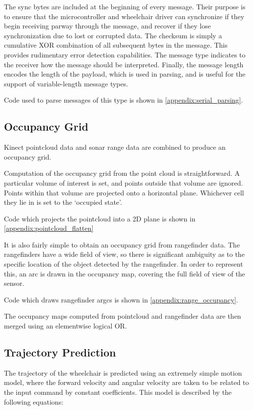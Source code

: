 \documentclass[oneside,final,a4paper]{report}
\begin{document}
The sync bytes are included at the beginning of every message.  Their purpose is to ensure that the microcontroller and wheelchair driver can synchronize if they begin receiving parway through the message, and recover if they lose synchronization due to lost or corrupted data.  The checksum is simply a cumulative XOR combination of all subsequent bytes in the message.  This provides rudimentary error detection capabilities.  The message type indicates to the receiver how the message should be interpreted.  Finally, the message length encodes the length of the payload, which is used in parsing, and is useful for the support of variable-length message types.

Code used to parse messages of this type is shown in \ref{appendix:serial_parsing}.

\subsection{Occupancy Grid}
Kinect pointcloud data and sonar range data are combined to produce an occupancy grid.  

Computation of the occupancy grid from the point cloud is straightforward.  A particular volume of interest is set, and points outside that volume are ignored.  Points within that volume are projected onto a horizontal plane.  Whichever cell they lie in is set to the `occupied state'.

Code which projects the pointcloud into a 2D plane is shown in \ref{appendix:pointcloud_flatten}

It is also fairly simple to obtain an occupancy grid from rangefinder data.  The rangefinders have a wide field of view, so there is significant ambiguity as to the specific location of the object detected by the rangefinder.  In order to represent this, an arc is drawn in the occupancy map, covering the full field of view of the sensor.

Code which draws rangefinder argcs is shown in \ref{appendix:range_occupancy}.

The occupancy maps computed from pointcloud and rangefinder data are then merged using an elementwise logical OR.

\subsection{Trajectory Prediction}
The trajectory of the wheelchair is predicted using an extremely simple motion model, where the forward velocity and angular velocity are taken to be related to the input command by constant coefficients.  This model is described by the following equations:
\end{document}
